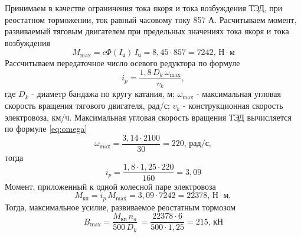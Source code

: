 Принимаем в качестве ограничения тока якоря и тока возбуждения ТЭД,  при реостатном торможении, ток равный часовому току 857 А. Расчитываем момент, развиваемый тяговым двигателем при предельных значениях тока якоря и тока возбуждения
\begin{equation*}
 M_{\max} = c\Phi(I_{\text{ч}}) \, I_{\text{ч}} = 8,45 \cdot 857 = 7242, \, \text{Н} \cdot \text{м} 
\end{equation*}
Рассчитываем передаточное число осевого редуктора по формуле
\begin{equation}
 \label{eq:reductor}
 i_p = \frac{1,8 \, D_k \, \omega_{\max}}{v_k},
\end{equation}
где $D_k$ - диаметр бандажа по кругу катания, м; $\omega_{\max}$ - максимальная угловая скорость вращения тягового двигателя, рад/с; $v_k$ - конструкционная скорость электровоза, км/ч. Максимальная угловая скорость вращения ТЭД вычисляется по формуле \eqref{eq:omega}
\begin{equation*}
 \omega_{\max} = \frac{3,14 \cdot 2100}{30} = 220, \, \text{рад/с},
\end{equation*}
тогда
\begin{equation*}
 i_p = \frac{1,8 \cdot 1,25 \cdot 220}{160} = 3,09
\end{equation*}
Момент, приложенный к одной колесной паре электровоза
\begin{equation*}
 M_{\text{кп}} = i_p \, M_{\max} = 3,09 \cdot 7242 = 22378, \, \text{Н} \cdot \text{м},
\end{equation*}
Тогда, максимальное усилие, развиваемое реостатным тормозом
\begin{equation*}
 B_{\max} = \frac{M_{\text{кп}} \, n_a}{ 500 \, D_k} \,  = \frac{22378 \cdot 6}{500 \cdot 1,25} = 215, \, \text{кН} 
\end{equation*}










